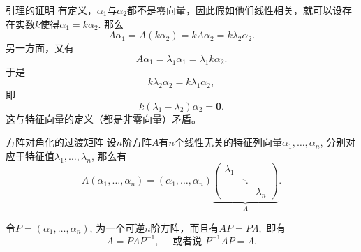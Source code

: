 \begin{frame}

\begin{block}{引理的证明}
有定义，$\alpha_1$与$\alpha_2$都不是零向量，因此假如他们线性相关，就可以设存在实数$k$使得$\alpha_1=k\alpha_2$. 那么
\[A\alpha_1 = A(k\alpha_2) = kA\alpha_2 = k\lambda_2\alpha_2.\]
另一方面，又有
\[A\alpha_1 = \lambda_1\alpha_1 = \lambda_1k\alpha_2.\]
于是
\[k\lambda_2\alpha_2 = k\lambda_1\alpha_2,\]
即
\[k(\lambda_1-\lambda_2)\alpha_2 = \mathbf{0}.\]
这与特征向量的定义（都是非零向量）矛盾。
\end{block}

\end{frame}


\begin{frame}

\begin{block}{方阵对角化的过渡矩阵}
设$n$阶方阵$A$有$n$个线性无关的特征列向量$\alpha_1,\ldots,\alpha_n$, 分别对应于特征值$\lambda_1,\ldots,\lambda_n$, 那么有
\[A(\alpha_1,\ldots,\alpha_n) = (\alpha_1,\ldots,\alpha_n) \underbrace{\begin{pmatrix} \lambda_1 & & \\ & \ddots & \\ & & \lambda_n \end{pmatrix}}_{\Lambda}.\]

\vspace{1em}
\pause

令$P = (\alpha_1,\ldots,\alpha_n)$, 为一个可逆$n$阶方阵，而且有$AP = P\Lambda,$ 即有
\[A = P\Lambda P^{-1}, \quad \text{ 或者说 } P^{-1}AP = \Lambda.\]
\end{block}

\end{frame}


